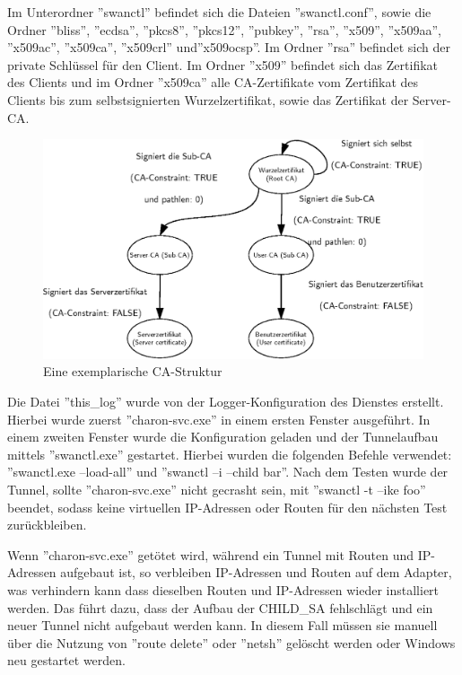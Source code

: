 Im Unterordner ''swanctl'' befindet sich die Dateien ''swanctl.conf'',
sowie die Ordner ''bliss'', ''ecdsa'', ''pkcs8'', ''pkcs12'', ''pubkey'', ''rsa'', ''x509'',
''x509aa'', ''x509ac'', ''x509ca'', ''x509crl'' und''x509ocsp''.
Im Ordner ''rsa'' befindet sich der private Schlüssel für den Client. Im Ordner
''x509'' befindet sich das Zertifikat des Clients und im Ordner ''x509ca'' alle
\ac{CA}-Zertifikate vom Zertifikat des Clients bis zum selbstsignierten Wurzelzertifikat,
sowie das Zertifikat der Server-\ac{CA}.

\begin{figure}
\def\svgwidth{\columnwidth}
\includegraphics[width=\textwidth]{CA-Struktur.eps}
\caption{Eine exemplarische CA-Struktur}
\label{fig:CA-Struktur}
\end{figure}

Die Datei ''this\_log'' wurde von der Logger-Konfiguration des Dienstes erstellt.
Hierbei wurde zuerst ''charon-svc.exe''
in einem ersten Fenster ausgeführt. In einem zweiten Fenster wurde die Konfiguration geladen
und der Tunnelaufbau mittels ''swanctl.exe'' gestartet. Hierbei wurden die folgenden
Befehle verwendet: ''swanctl.exe --load-all'' und ''swanctl --i --child bar''.
Nach dem Testen wurde der Tunnel, sollte ''charon-svc.exe'' nicht gecrasht sein, mit ''swanctl -t --ike foo''
beendet, sodass keine virtuellen IP-Adressen oder Routen für den nächsten Test zurückbleiben.

Wenn ''charon-svc.exe'' getötet wird, während ein Tunnel mit Routen und \ac{IP}-Adressen
aufgebaut ist, so verbleiben IP-Adressen und Routen auf dem Adapter, was verhindern kann dass
dieselben Routen und \ac{IP}-Adressen wieder installiert werden. Das führt dazu, dass der
Aufbau der CHILD\_SA fehlschlägt und ein neuer Tunnel nicht aufgebaut werden kann.
In diesem Fall müssen sie manuell über die Nutzung von ''route delete'' oder ''netsh''
gelöscht werden oder Windows neu gestartet werden.

